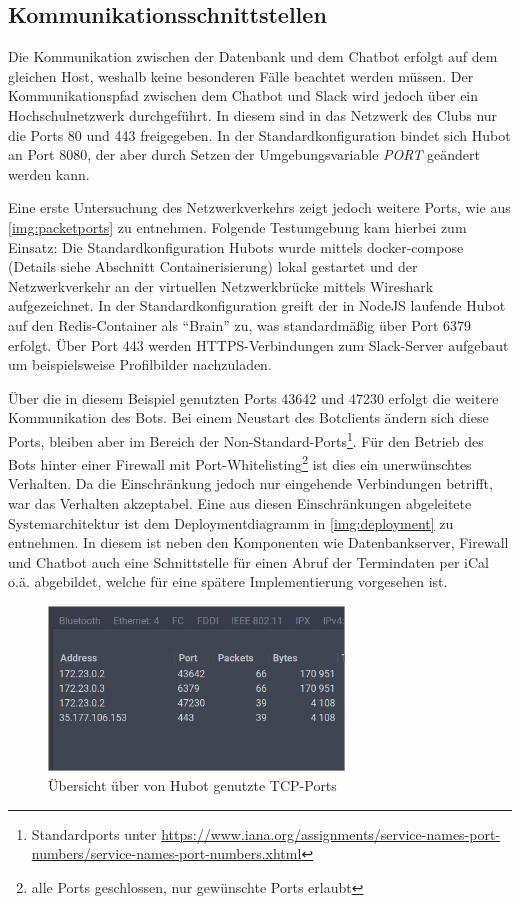 \subsection{Kommunikationsschnittstellen}

Die Kommunikation zwischen der Datenbank und dem Chatbot erfolgt auf dem gleichen Host, weshalb keine besonderen Fälle beachtet werden müssen. Der Kommunikationspfad zwischen dem Chatbot und Slack wird jedoch über ein Hochschulnetzwerk durchgeführt. In diesem sind in das Netzwerk des Clubs nur die Ports 80 und 443 freigegeben. In der Standardkonfiguration bindet sich Hubot an Port 8080, der aber durch Setzen der Umgebungsvariable \textit{PORT} geändert werden kann.

Eine erste Untersuchung des Netzwerkverkehrs zeigt jedoch weitere Ports, wie aus \autoref{img:packetports} zu entnehmen. Folgende Testumgebung kam hierbei zum Einsatz:
Die Standardkonfiguration Hubots wurde mittels docker-compose (Details siehe Abschnitt Containerisierung) lokal gestartet und der Netzwerkverkehr an der virtuellen Netzwerkbrücke mittels Wireshark aufgezeichnet. In der Standardkonfiguration greift der in NodeJS laufende Hubot auf den Redis-Container als \enquote{Brain} zu, was standardmäßig über Port 6379 erfolgt. Über Port 443 werden HTTPS-Verbindungen zum Slack-Server aufgebaut um beispielsweise Profilbilder nachzuladen.

Über die in diesem Beispiel genutzten Ports 43642 und 47230 erfolgt die weitere Kommunikation des Bots. Bei einem Neustart des Botclients ändern sich diese Ports, bleiben aber im Bereich der Non-Standard-Ports\footnote{Standardports unter \url{https://www.iana.org/assignments/service-names-port-numbers/service-names-port-numbers.xhtml}}. Für den Betrieb des Bots hinter einer Firewall mit Port-Whitelisting\footnote{alle Ports geschlossen, nur gewünschte Ports erlaubt} ist dies ein unerwünschtes Verhalten. Da die Einschränkung jedoch nur eingehende Verbindungen betrifft, war das Verhalten akzeptabel. Eine aus diesen Einschränkungen abgeleitete Systemarchitektur ist dem Deploymentdiagramm in \autoref{img:deployment} zu entnehmen.
In diesem ist neben den Komponenten wie Datenbankserver, Firewall und Chatbot auch eine Schnittstelle für einen Abruf der Termindaten per iCal o.ä. abgebildet, welche für eine spätere Implementierung vorgesehen ist.

\begin{figure}[htbp]
    \centering
    \includegraphics[width=0.7\textwidth]{img/packetports.png}
    \caption{Übersicht über von Hubot genutzte TCP-Ports}
    \label{img:packetports}
\end{figure}

